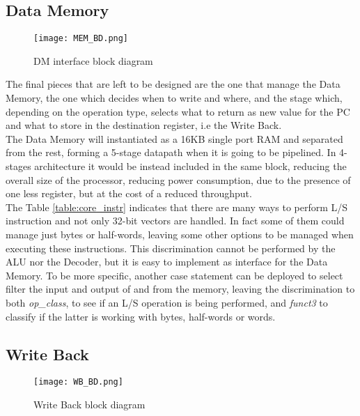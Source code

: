 \subsection{Data Memory}
\begin{figure}[!ht]
    \centering
    \texttt{[image: MEM\_BD.png]}
    \caption{DM interface block diagram}
    \label{fig:DM_BD}
\end{figure}

The final pieces that are left to be designed are the one that manage the Data Memory, the one which decides when to write and where, and the stage which, depending on the operation type, selects what to return as new value for the PC and what to store in the destination register, i.e the Write Back.\\
The Data Memory will instantiated as a 16KB single port RAM and separated from the rest, forming a 5-stage datapath when it is going to be pipelined. In 4-stages architecture it would be instead included in the same block, reducing the overall size of the processor, reducing power consumption, due to the presence of one less register, but at the cost of a reduced throughput.\\
The Table \ref{table:core_instr} indicates that there are many ways to perform L/S instruction and not only 32-bit vectors are handled. In fact some of them could manage just bytes or half-words, leaving some other options to be managed when executing these instructions. This discrimination cannot be performed by the ALU nor the Decoder, but it is easy to implement as interface for the Data Memory.
To be more specific, another case statement can be deployed to select filter the input and output of and from the memory, leaving the discrimination to both \emph{op{\_}class}, to see if an L/S operation is being performed, and \emph{funct3} to classify if the latter is working with bytes, half-words or words.

\subsection{Write Back}
\begin{figure}[!ht]
    \centering
    \texttt{[image: WB\_BD.png]}
    \caption{Write Back block diagram}
    \label{fig:WB_BD}
\end{figure}

